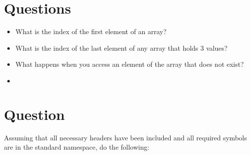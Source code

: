 \section*{Questions}

\begin{itemize}

  \item What is the index of the first element of an array?
    \vfill

  \item What is the index of the last element of any array that holds 3 values?
    \vfill

  \item What happens when you access an element of the array that does not
    exist?
    \vfill
    \vfill

  \item \memoryImage
    \inputminted{cpp}{\docCodeDir/.arrays.cpp.gen.section.array}

\end{itemize}


\newpage

\section{Question}


Assuming that all necessary headers have been included and all required symbols
are in the standard namespace, do the following:

